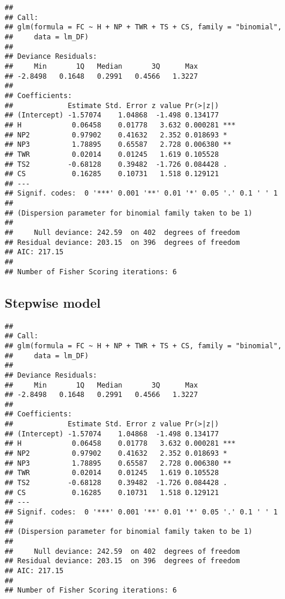 \documentclass[]{article}
\begin{document}
\begin{verbatim}
## 
## Call:
## glm(formula = FC ~ H + NP + TWR + TS + CS, family = "binomial", 
##     data = lm_DF)
## 
## Deviance Residuals: 
##     Min       1Q   Median       3Q      Max  
## -2.8498   0.1648   0.2991   0.4566   1.3227  
## 
## Coefficients:
##             Estimate Std. Error z value Pr(>|z|)    
## (Intercept) -1.57074    1.04868  -1.498 0.134177    
## H            0.06458    0.01778   3.632 0.000281 ***
## NP2          0.97902    0.41632   2.352 0.018693 *  
## NP3          1.78895    0.65587   2.728 0.006380 ** 
## TWR          0.02014    0.01245   1.619 0.105528    
## TS2         -0.68128    0.39482  -1.726 0.084428 .  
## CS           0.16285    0.10731   1.518 0.129121    
## ---
## Signif. codes:  0 '***' 0.001 '**' 0.01 '*' 0.05 '.' 0.1 ' ' 1
## 
## (Dispersion parameter for binomial family taken to be 1)
## 
##     Null deviance: 242.59  on 402  degrees of freedom
## Residual deviance: 203.15  on 396  degrees of freedom
## AIC: 217.15
## 
## Number of Fisher Scoring iterations: 6
\end{verbatim}

\hypertarget{stepwise-model}{%
\subsection{Stepwise model}\label{stepwise-model}}

\begin{verbatim}
## 
## Call:
## glm(formula = FC ~ H + NP + TWR + TS + CS, family = "binomial", 
##     data = lm_DF)
## 
## Deviance Residuals: 
##     Min       1Q   Median       3Q      Max  
## -2.8498   0.1648   0.2991   0.4566   1.3227  
## 
## Coefficients:
##             Estimate Std. Error z value Pr(>|z|)    
## (Intercept) -1.57074    1.04868  -1.498 0.134177    
## H            0.06458    0.01778   3.632 0.000281 ***
## NP2          0.97902    0.41632   2.352 0.018693 *  
## NP3          1.78895    0.65587   2.728 0.006380 ** 
## TWR          0.02014    0.01245   1.619 0.105528    
## TS2         -0.68128    0.39482  -1.726 0.084428 .  
## CS           0.16285    0.10731   1.518 0.129121    
## ---
## Signif. codes:  0 '***' 0.001 '**' 0.01 '*' 0.05 '.' 0.1 ' ' 1
## 
## (Dispersion parameter for binomial family taken to be 1)
## 
##     Null deviance: 242.59  on 402  degrees of freedom
## Residual deviance: 203.15  on 396  degrees of freedom
## AIC: 217.15
## 
## Number of Fisher Scoring iterations: 6
\end{verbatim}
\end{document}
